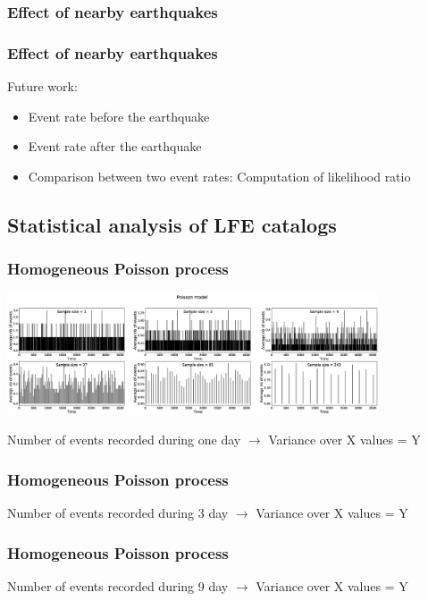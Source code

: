 \documentclass{beamer}
\begin{document}
	\begin{frame}
		\frametitle{Effect of nearby earthquakes}
	\end{frame}

	\begin{frame}
		\frametitle{Effect of nearby earthquakes}
		Future work:
		\begin{itemize}
			\item Event rate before the earthquake
			\item Event rate after the earthquake
			\item Comparison between two event rates: Computation of likelihood ratio
		\end{itemize}
	\end{frame}


	\subsection{Statistical analysis of LFE catalogs}

	\begin{frame}
		\frametitle{Homogeneous Poisson process}
		\begin{center}
			\includegraphics[width=11cm, trim={0cm 0cm 0cm 0cm}, clip]{other/Poisson.eps}
		\end{center}
		Number of events recorded during one day $\rightarrow$ Variance over X values = Y
	\end{frame}

	\begin{frame}
		\frametitle{Homogeneous Poisson process}
		Number of events recorded during 3 day $\rightarrow$ Variance over X values = Y
	\end{frame}

	\begin{frame}
		\frametitle{Homogeneous Poisson process}
		Number of events recorded during 9 day $\rightarrow$ Variance over X values = Y
	\end{frame}
\end{document}
